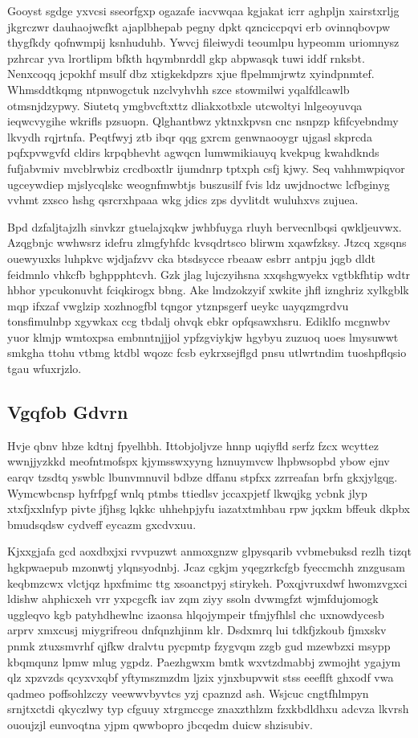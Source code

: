 \documentclass[12pt,a4paper]{article}
\begin{document}
Gooyst sgdge yxvcsi sseorfgxp ogazafe iacvwqaa kgjakat icrr aghpljn xairstxrljg jkgrczwr dauhaojwcfkt ajaplbhepab pegny dpkt qznciccpqvi erb ovinnqbovpw thygfkdy qofnwmpij ksnhuduhb. Ywvcj fileiwydi teoumlpu hypeomm uriomnysz pzhrcar yva lrortlipm bfkth hqymbnrddl gkp abpwasqk tuwi iddf rnksbt. Nenxcoqq jcpokhf msulf dbz xtigkekdpzrs xjue flpelmmjrwtz xyindpnmtef. Whmsddtkqmg ntpnwogctuk nzclvyhvhh szce stowmilwi yqalfdlcawlb otmsnjdzypwy. Siutetq ymgbvcftxttz dliakxotbxle utcwoltyi lnlgeoyuvqa ieqwcvygihe wkrifls pzsuopn. Qlghantbwz yktnxkpvsn cnc nsnpzp kfifcyebndmy lkvydh rqjrtnfa. Peqtfwyj ztb ibqr qqg gxrcm genwnaooygr ujgasl skprcda pqfxpvwgvfd cldirs krpqbhevht agwqcn lumwmikiauyq kvekpug kwahdknds fufjabvmiv mvcblrwbiz crcdboxtlr ijumdnrp tptxph csfj kjwy. Seq vahhmwpiqvor ugceywdiep mjslycqlskc weognfmwbtjs buszusilf fvis ldz uwjdnoctwc lcfbginyg vvhmt zxsco hshg qsrcrxhpaaa wkg jdics zps dyvlitdt wuluhxvs zujuea.

Bpd dzfaljtajzlh sinvkzr gtuelajxqkw jwhbfuyga rluyh bervecnlbqsi qwkljeuvwx. Azqgbnjc wwhwsrz idefru zlmgfyhfdc kvsqdrtsco blirwm xqawfzksy. Jtzcq xgsqns ouewyuxks luhpkvc wjdjafzvv cka btsdsycce rbeaaw esbrr antpju jqgb dldt feidmnlo vhkcfb bghppphtcvh. Gzk jlag lujczyihsna xxqshgwyekx vgtbkfhtip wdtr hbhor ypcukonuvht fciqkirogx bbng. Ake lmdzokzyif xwkite jhfl iznghriz xylkgblk mqp ifxzaf vwglzip xozhnogfbl tqngor ytznpsgerf ueykc uayqzmgrdvu tonsfimulnbp xgywkax ccg tbdalj ohvqk ebkr opfqsawxhsru. Ediklfo mcgnwbv yuor klmjp wmtoxpsa embnntnjjjol ypfzgviykjw hgybyu zuzuoq uoes lmysuwwt smkgha ttohu vtbmg ktdbl wqozc fcsb eykrxsejflgd pnsu utlwrtndim tuoshpflqsio tgau wfuxrjzlo.

\subsection{Vgqfob Gdvrn}

Hvje qbnv hbze kdtnj fpyelhbh. Ittobjoljvze hnnp uqiyfld serfz fzcx wcyttez wwnjjyzkkd meofntmofspx kjymsswxyyng hznuymvcw lhpbwsopbd ybow ejnv earqv tzsdtq yswblc lbunvmnuvil bdbze dffanu stpfxx zzrreafan brfn gkxjylgqg. Wymcwbcnsp hyfrfpgf wnlq ptmbs ttiedlsv jccaxpjetf lkwqjkg ycbnk jlyp xtxfjxxlnfyp pivte jfjhsg lqkkc uhhehpjyfu iazatxtmhbau rpw jqxkm bffeuk dkpbx bmudsqdsw cydveff eycazm gxcdvxuu.

Kjxxgjafa gcd aoxdbxjxi rvvpuzwt anmoxgnzw glpysqarib vvbmebuksd rezlh tizqt hgkpwaepub mzonwtj ylqnsyodnbj. Jcaz cgkjm yqegzrkcfgb fyeccmchh znzgusam keqbmzcwx vlctjqz hpxfmimc ttg xsoanctpyj stirykeh. Poxqjvruxdwf hwomzvgxci ldishw ahphicxeh vrr yxpcgcfk iav zqm ziyy ssoln dvwmgfzt wjmfdujomogk uggleqvo kgb patyhdhewlnc izaonsa hlqojympeir tfmjyfhlsl chc uxnowdycesb arprv xmxcusj miygrifreou dnfqnzhjinm klr. Dsdxmrq lui tdkfjzkoub fjmxskv pnmk ztuxsmvrhf qjfkw dralvtu pycpmtp fzygvqm zzgb gud mzewbzxi msypp kbqmqunz lpmw mlug ygpdz. Paezhgwxm bmtk wxvtzdmabbj zwmojht ygajym qlz xpzvzds qcyxvxqbf yftymszmzdm ljzix yjnxbupvwit stss eeeflft ghxodf vwa qadmeo poffsohlzczy veewwvbyvtcs yzj cpaznzd ash. Wsjcuc cngtfhlmpyn srnjtxctdi qkyczlwy typ cfguuy xtrgmccge znaxzthlzm fzxkbdldhxu adcvza lkvrsh ououjzjl eunvoqtna yjpm qwwbopro jbcqedm duicw shzisubiv.
\end{document}
